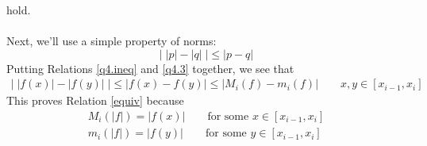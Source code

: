 \documentclass[12pt]{article}
\theoremstyle{plain}
\theoremstyle{definition}
\theoremstyle{remark}
\begin{document}
\begin{enumerate}
    hold.
    \\
    \\
    Next, we'll use a simple property of norms:
    \begin{equation}
        \label{q4.3}
        \left\lvert \;|p| - |q| \;\right\rvert 
            \leq 
        \left\lvert p - q \right\rvert 
    \end{equation}
    Putting Relations \ref{q4.ineq} and 
    \ref{q4.3} together, we see that 
    \begin{align*}
        \left\lvert \; |f(x)| - |f(y)| \;\right\rvert 
        \leq 
        \left\lvert f(x) - f(y)\right\rvert 
        \leq 
        \left\lvert M_i(f) - m_i(f)\right\rvert 
        \qquad x, y \in[x_{i-1}, x_i]
    \end{align*}
    This proves Relation \ref{equiv} because
    \begin{align*}
        M_i(|f|) = |f(x)|\qquad 
            \text{for some $x \in [x_{i-1}, x_i]$} \\
        m_i(|f|) = |f(y)|\qquad 
            \text{for some $y \in [x_{i-1}, x_i]$} 
    \end{align*}





\end{enumerate}
\end{document}
